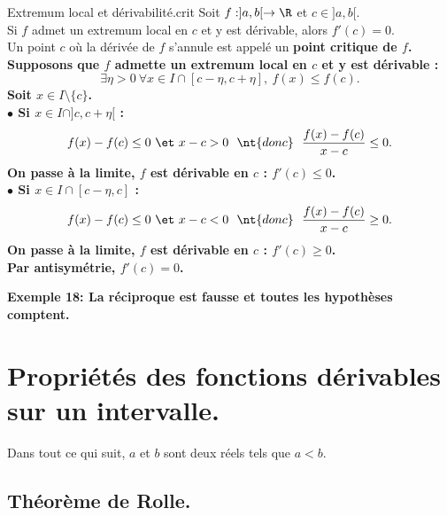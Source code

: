 \documentclass[11pt]{article}
\begin{document}
\begin{prop}{Extremum local et dérivabilité.}{crit}
    Soit $f:]a,b[\to\R$ et $c\in]a,b[$.\\
    Si $f$ admet un extremum local en $c$ et y est dérivable, alors $f'(c)=0$.\\
    Un point $c$ où la dérivée de $f$ s'annule est appelé un \bf{point critique} de $f$.
    \tcblower
    Supposons que $f$ admette un extremum local en $c$ et y est dérivable :
    \begin{equation*}
        \exists \eta > 0 ~ \forall x \in I \cap [c - \eta, c + \eta], ~ f(x) \leq f(c).
    \end{equation*}
    Soit $x \in I \setminus \{c\}$.\\
    $\bullet$ Si $x\in I\cap]c,c+\eta[$ :
    \begin{equation*}
        f(x)-f(c)\leq 0 ~\et~ x-c>0 ~~\nt{donc}~~ \frac{f(x)-f(c)}{x-c}\leq0.
    \end{equation*}
    On passe à la limite, $f$ est dérivable en $c$ : $f'(c)\leq0$.\\
    $\bullet$ Si $x\in I\cap[c-\eta,c]$ :
    \begin{equation*}
        f(x)-f(c)\leq0 ~\et~ x-c<0 ~~\nt{donc}~~ \frac{f(x)-f(c)}{x-c}\geq0.
    \end{equation*}
    On passe à la limite, $f$ est dérivable en $c$ : $f'(c)\geq0$.\\
    Par antisymétrie, $f'(c)=0$.
\end{prop}

\bf{Exemple 18:} La réciproque est fausse et toutes les hypothèses comptent.

\section{Propriétés des fonctions dérivables sur un intervalle.}

Dans tout ce qui suit, $a$ et $b$ sont deux réels tels que $a<b$.

\subsection{Théorème de Rolle.}

\vspace*{0.4cm}

\end{document}
